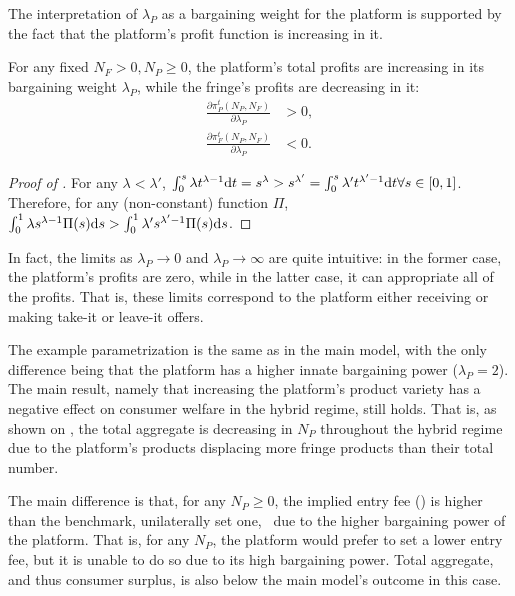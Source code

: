 The interpretation of $\lambda_P$ as a bargaining weight for the platform is supported by the fact that the platform's profit function is increasing in it.
\begin{proposition}
    \label{prop:lambda_P_comparative}
    For any fixed $N_F >0, N_P \geq 0$, the platform's total profits are increasing in its bargaining weight $\lambda_P$, while the fringe's profits are decreasing in it:
    \begin{align*}
        \frac{\partial \pi_P^t(N_P, N_F)}{\partial \lambda_P} &> 0, \\
        \frac{\partial \pi_F^t(N_P, N_F)}{\partial \lambda_P} &< 0.
    \end{align*}
\end{proposition}
\begin{proof}[Proof of ]
    For any $\lambda < \lambda'$, $\int_0^s \lambda t^{\lambda - 1} \mathrm{d}t = s^\lambda > s^{\lambda'} = \int_0^s \lambda' t^{\lambda' - 1} \mathrm{d}t \forall s \in [0, 1]$.
    Therefore, for any (non-constant) function $\Pi$, $\int_0^1 \lambda s^{\lambda - 1} \Pi(s) \mathrm{d}s > \int_0^1 \lambda' s^{\lambda' - 1} \Pi(s) \mathrm{d}s$.
\end{proof}
In fact, the limits as $\lambda_P \to 0$ and $\lambda_P \to \infty$ are quite intuitive: in the former case, the platform's profits are zero, while in the latter case, it can appropriate all of the profits.
That is, these limits correspond to the platform either receiving or making take-it or leave-it offers.

The example parametrization is the same as in the main model, with the only difference being that the platform has a higher innate bargaining power ($\lambda_P = 2$).
The main result, namely that increasing the platform's product variety has a negative effect on consumer welfare in the hybrid regime, still holds.
That is, as shown on , the total aggregate is decreasing in $N_P$ throughout the hybrid regime due to the platform's products displacing more fringe products than their total number.

The main difference is that, for any $N_P\geq 0$, the implied entry fee () is higher than the benchmark, unilaterally set one,  due to the higher bargaining power of the platform.
That is, for any $N_P$, the platform would prefer to set a lower entry fee, but it is unable to do so due to its high bargaining power.
Total aggregate, and thus consumer surplus, is also below the main model's outcome in this case.

